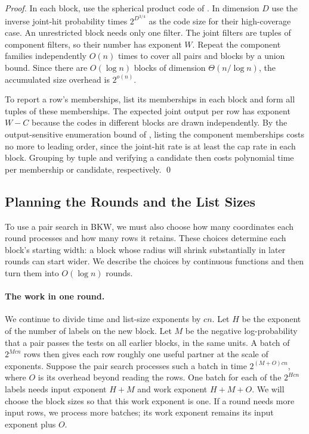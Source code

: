 \documentclass[runningheads,envcountsame,envcountsect,orivec]{llncs}
\begin{document}
\begin{proof}
In each block, use the spherical product code of
\cite[Definition~5.1, Lemma~5.1 and Theorem~5.1]{BDGL16}.
In dimension $D$ use the inverse joint-hit probability
times $2^{D^{3/4}}$ as the code size for their high-coverage
case. An unrestricted block needs only one filter. The joint
filters are tuples of component filters, so their number has
exponent $W$. Repeat the component families independently
$O(n)$ times to cover all pairs and blocks by a union bound.
Since there are $O(\log n)$ blocks of dimension
$\Theta(n/\log n)$, the accumulated size overhead is
$2^{o(n)}$.

To report a row's memberships, list its memberships in each
block and form all tuples of these memberships. The
expected joint output per row has exponent $W-C$ because
the codes in different blocks are drawn independently.
By the output-sensitive enumeration bound of
\cite[Lemma~5.1]{BDGL16}, listing the component memberships
costs no more to leading order, since the joint-hit rate
is at least the cap rate in each block. Grouping by tuple
and verifying a candidate then costs polynomial time per
membership or candidate, respectively.
\qed
\end{proof}

\subsection{Planning the Rounds and the List Sizes}
\label{sec:shared-schedule}

To use a pair search in BKW, we must also choose how many
coordinates each round processes and how many rows it retains.
These choices determine each block's starting width: a block whose
radius will shrink substantially in later rounds can start wider.
We describe the choices by continuous functions and then turn them
into $O(\log n)$ rounds.

\paragraph{The work in one round.}
We continue to divide time and list-size exponents by $cn$. Let $H$ be the exponent
of the number of labels on the new block. Let $M$ be the
negative log-probability that a pair passes the tests on all
earlier blocks, in the same units. A batch of $2^{Mcn}$ rows
then gives each row roughly one useful partner at the scale
of exponents. Suppose the pair search processes such a batch
in time $2^{(M+O)cn}$, where $O$ is its overhead beyond reading
the rows. One batch for each of the $2^{Hcn}$ labels needs
input exponent $H+M$ and work exponent $H+M+O$.
We will choose the block sizes so that this work exponent is one.
If a round needs more input rows, we process more batches;
its work exponent remains its input exponent plus $O$.
\end{document}
